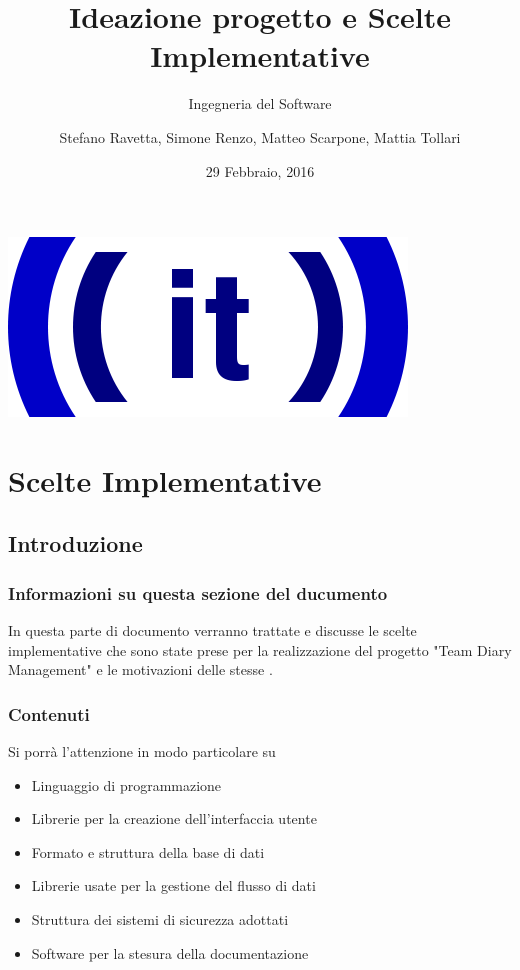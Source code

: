 \documentclass[12pt]{scrartcl}
\title{Ideazione progetto e Scelte Implementative}
\subtitle{Ingegneria del Software}
\author{Stefano Ravetta, Simone Renzo, Matteo Scarpone, Mattia Tollari}
\date{29 Febbraio, 2016}
\begin{document}
\maketitle
\centerline{\includegraphics[scale=0.5]{ITicon.png}}

\tableofcontents
\section{Scelte Implementative}
\subsection{Introduzione}	%

\subsubsection{Informazioni su questa sezione del ducumento}
In questa parte di documento verranno trattate e discusse le scelte
implementative che sono state prese per la realizzazione del progetto "Team Diary Management"
e le motivazioni delle stesse .

\subsubsection{Contenuti}
Si porr\`a l'attenzione in modo particolare su
\begin{itemize}
    \item Linguaggio di programmazione
    \item Librerie per la creazione dell'interfaccia utente
    \item Formato e struttura della base di dati
    \item Librerie usate per la gestione del flusso di dati
    \item Struttura dei sistemi di sicurezza adottati
    \item Software per la stesura della documentazione
\end{itemize}
\end{document}
